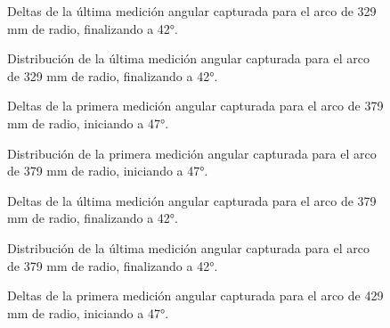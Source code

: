 \begin{figure}[H]
	\centering
	\caption{Deltas de la última medición angular capturada para el arco de 329 mm de radio, finalizando a 42°.}
	\label{fig:lecturas_theta42_5}
\end{figure}

\begin{figure}[H]
	\centering
	\caption{Distribución de la última medición angular capturada para el arco de 329 mm de radio, finalizando a 42°.}
	\label{fig:histograma_theta42_5}
\end{figure}

\begin{figure}[H]
	\centering
	\caption{Deltas de la primera medición angular capturada para el arco de 379 mm de radio, iniciando a 47°.}
	\label{fig:lecturas_theta47_6}
\end{figure}

\begin{figure}[H]
	\centering
	\caption{Distribución de la primera medición angular capturada para el arco de 379 mm de radio, iniciando a 47°.}
	\label{fig:histograma_theta47_6}
\end{figure}

\begin{figure}[H]
	\centering
	\caption{Deltas de la última medición angular capturada para el arco de 379 mm de radio, finalizando a 42°.}
	\label{fig:lecturas_theta42_6}
\end{figure}

\begin{figure}[H]
	\centering
	\caption{Distribución de la última medición angular capturada para el arco de 379 mm de radio, finalizando a 42°.}
	\label{fig:histograma_theta42_6}
\end{figure}

\begin{figure}[H]
	\centering
	\caption{Deltas de la primera medición angular capturada para el arco de 429 mm de radio, iniciando a 47°.}
	\label{fig:lecturas_theta47_7}
\end{figure}

